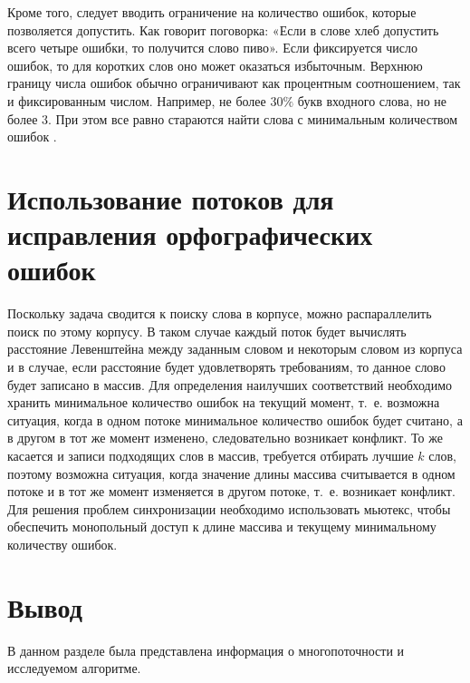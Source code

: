 Кроме того, следует вводить ограничение на количество ошибок, которые позволяется допустить. Как говорит поговорка: «Если в слове хлеб допустить всего четыре ошибки, то получится слово пиво». 
Если фиксируется число ошибок, то для коротких слов оно может оказаться избыточным.
Верхнюю границу числа ошибок обычно ограничивают как процентным соотношением, так и фиксированным числом. 
Например, не более $30\%$ букв входного слова, но не более 3.
При этом все равно стараются найти слова с минимальным количеством ошибок \cite{miem}.

\section{Использование потоков для исправления орфографических ошибок}

Поскольку задача сводится к поиску слова в корпусе, можно распараллелить поиск по этому корпусу. В таком случае каждый поток будет вычислять расстояние Левенштейна между заданным словом и некоторым словом из корпуса и в случае, если расстояние будет удовлетворять требованиям, то данное слово будет записано в массив. Для определения наилучших соответствий необходимо хранить минимальное количество ошибок на текущий момент, т.~е. возможна ситуация, когда в одном потоке минимальное количество ошибок будет считано, а в другом в тот же момент изменено, следовательно возникает конфликт. То же касается и записи подходящих слов в массив, требуется отбирать лучшие $k$ слов, поэтому возможна ситуация, когда значение длины массива считывается в одном потоке и в тот же момент изменяется в другом потоке, т.~е. возникает конфликт. Для решения проблем синхронизации необходимо использовать мьютекс, чтобы обеспечить монопольный доступ к длине массива и текущему минимальному количеству ошибок. 

\section*{Вывод} 
В данном разделе была представлена информация о многопоточности
и исследуемом алгоритме.